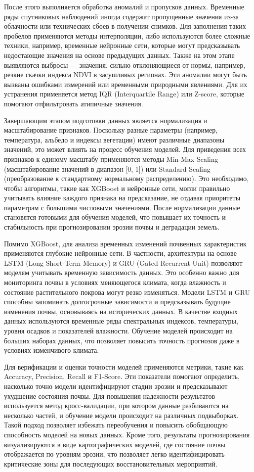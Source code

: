 После этого выполняется обработка аномалий и пропусков данных. Временные
ряды спутниковых наблюдений иногда содержат пропущенные значения из-за
облачности или технических сбоев в получении снимков. Для заполнения
таких пробелов применяются методы интерполяции, либо используются более
сложные техники, например, временные нейронные сети, которые могут
предсказывать недостающие значения на основе предыдущих данных. Также на
этом этапе выявляются выбросы --- значения, сильно отклоняющиеся от
нормы, например, резкие скачки индекса NDVI в засушливых регионах. Эти
аномалии могут быть вызваны ошибками измерений или временными природными
явлениями. Для их устранения применяется метод IQR (Interquartile Range)
или Z-score, которые помогают отфильтровать атипичные значения.

Завершающим этапом подготовки данных является нормализация и
масштабирование признаков. Поскольку разные параметры (например,
температура, альбедо и индексы вегетации) имеют различные диапазоны
значений, это может влиять на процесс обучения моделей. Для приведения
всех признаков к единому масштабу применяются методы Min-Max Scaling
(масштабирование значений в диапазон {[}0, 1{]}) или Standard Scaling
(преобразование к стандартному нормальному распределению). Это
необходимо, чтобы алгоритмы, такие как XGBoost и нейронные сети, могли
правильно учитывать влияние каждого признака на предсказание, не отдавая
приоритеты параметрам с большими числовыми значениями. После
нормализации данные становятся готовыми для обучения моделей, что
повышает их точность и стабильность при прогнозировании эрозии почвы и
деградации земель.

Помимо XGBoost, для анализа временных изменений почвенных характеристик
применяются глубокие нейронные сети. В частности, архитектуры на основе
LSTM (Long Short-Term Memory) и GRU (Gated Recurrent Unit) позволяют
моделям учитывать временную зависимость данных. Это особенно важно для
мониторинга почвы в условиях меняющегося климата, когда влажность и
состояние растительного покрова могут резко изменяться. Модели LSTM и
GRU способны запоминать долгосрочные зависимости и предсказывать будущие
изменения почвы, основываясь на исторических данных. В качестве входных
данных используются временные ряды спектральных индексов, температуры,
уровня осадков и показателей влажности. Обучение моделей происходит на
больших наборах данных, что позволяет повысить точность прогнозов даже в
условиях изменчивого климата.

Для верификации и оценки точности моделей применяются метрики, такие как
Accuracy, Precision, Recall и F1-Score. Эти показатели помогают
определить, насколько точно модели идентифицируют стадии эрозии и
предсказывают ухудшение состояния почвы. Для повышения надежности
результатов используется метод кросс-валидации, при котором данные
разбиваются на несколько частей, и обучение модели происходит на
различных подвыборках. Такой подход позволяет избежать переобучения и
повысить обобщающую способность моделей на новых данных. Кроме того,
результаты прогнозирования визуализируются в виде картографических
моделей, где состояние почвы отображается по уровням эрозии, что
позволяет легко идентифицировать критические зоны для последующих
восстановительных мероприятий.


